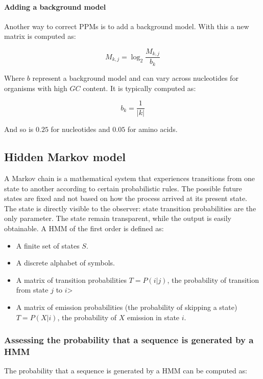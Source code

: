 			\paragraph{Adding a background model}
			Another way to correct PPMs is to add a background model.
			With this a new matrix is computed as:

			$$M_{k,j} = \log_2\frac{M_{k,j}}{b_k}$$

			Where $b$ represent a background model and can vary across nucleotides for organisms with high $GC$ content.
			It is typically computed as:

			$$b_k = \frac{1}{|k|}$$

			And so is $0.25$ for nucleotides and $0.05$ for amino acids.


	\subsection{Hidden Markov model}
	A Markov chain is a mathematical system that experiences transitions from one state to another according to certain probabilistic rules.
	The possible future states are fixed and not based on how the process arrived at its present state.
	The state is directly visible to the observer: state transition probabilities are the only parameter.
	The state remain transparent, while the output is easily obtainable.
	A HMM of the first order is defined as:

	\begin{multicols}{2}
		\begin{itemize}
			\item A finite set of states $S$.
			\item A discrete alphabet of symbols.
			\item A matrix of transition probabilities $T = P(i|j)$, the probability of transition from state $j$ to $i$>
			\item A matrix of emission probabilities (the probability of skipping a state) $T = P(X|i)$, the probability of $X$ emission in state $i$.
		\end{itemize}
	\end{multicols}

		\subsubsection{Assessing the probability that a sequence is generated by a HMM}
		The probability that a sequence is generated by a HMM can be computed as:

